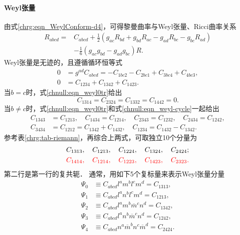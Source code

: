 \paragraph{Weyl张量}
由式\eqref{chrg:eqn_WeylConform-d4}，可得黎曼曲率与Weyl张量、Ricci曲率关系
\begin{equation}\label{chnull:eqn_weyl4dim}
    \begin{aligned}
    R_{abcd}{=}& C_{abcd} + \frac{1}{2} ( g_{ac}R_{bd} + g_{bd}R_{ac}
     - g_{ad}R_{bc} - g_{bc}R_{ad} ) \\
     &- \frac{1}{6} (g_{ac}g_{bd}-g_{ad}g_{bc}) R .
    \end{aligned}
\end{equation}
Weyl张量是无迹的，且遵循循环恒等式
\begin{align}
    0 &= g^{ad}C_{abcd} =- C_{1bc2}- C_{2bc1}+C_{3bc4}+C_{4bc3}, \label{chnull:eqn_weyl0tr} \\
    0 &= C_{1234}+C_{1342}+C_{1423}. \label{chnull:eqn_weyl-cycle}
\end{align}
当$b=c$时，式\eqref{chnull:eqn_weyl0tr}给出
\begin{equation}
    C_{1314} = C_{2324} = C_{1332} = C_{1442} = 0.
\end{equation}
当$b\neq c$时，式\eqref{chnull:eqn_weyl0tr}和式\eqref{chnull:eqn_weyl-cycle}一起给出
\begin{align}
    C_{1343}&=C_{1213}, \quad  C_{1434}=C_{1214}, \quad  C_{2343}=C_{1232}, \quad
    C_{2434}=C_{1242}, \\
    C_{3434}&= C_{1212} = C_{1342} + C_{1432}, \quad
    C_{1234}=C_{1432}- C_{1342}.
\end{align}
参考表\ref{chrg:tab-riemann}，再综合上两式，可取独立10个分量为
\begin{equation}\label{chnull:eqn_ind-C}
    \begin{aligned}
        &C_{1313}, \quad C_{1213}, \quad C_{1224}, \quad C_{1324}, \quad C_{2424};  \\
        &{\color{red} C_{1414},\quad C_{1214},\quad C_{1223},\quad C_{1423},
            \quad  C_{2323}. }
    \end{aligned}
\end{equation}
第二行是第一行的复共轭．
通常，用如下5个复标量来表示Weyl张量分量
\begin{subequations}\label{chnull:eqn_weylscalars-all}
    \begin{align}
        \Psi_0 &\equiv C_{abcd}l^a m^b l^c m^d = C_{1313} , \label{chnull:eqn_weylscalars0} \\
        \Psi_1 &\equiv C_{abcd}l^a n^b l^c m^d = C_{1213}, \label{chnull:eqn_weylscalars1} \\
        \Psi_2 &\equiv C_{abcd}l^a m^b \overline{m}^c n^d = C_{1342}, \label{chnull:eqn_weylscalars2} \\
        \Psi_3 &\equiv C_{abcd}l^a n^b \overline{m}^c n^d = C_{1242}, \label{chnull:eqn_weylscalars3} \\
        \Psi_4 &\equiv C_{abcd}n^a \overline{m}^b n^c \overline{m}^d = C_{2424}. \label{chnull:eqn_weylscalars4}
    \end{align}
\end{subequations}
